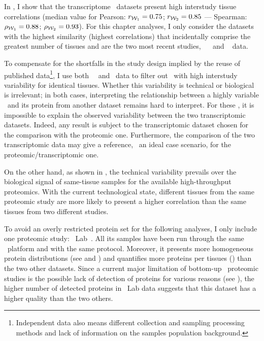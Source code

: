 In , I show that
the transcriptome \Rnaseq\ datasets present high interstudy tissue correlations
(median value for Pearson: $r_{\mathcal{W}_1}=0.75$; $r_{\mathcal{W}_2}=0.85$ ---
Spearman: $\rho_{\mathcal{W}_1}=0.88$; $\rho_{\mathcal{W}_2}=0.93$).
For this chapter analyses,
I only consider the datasets with the highest similarity
(highest correlations)
that incidentally comprise the greatest number of tissues
and are the two most recent studies,
\ie\ ~
and ~ data.\\
\vspace{-\baselineskip}

To compensate for the shortfalls in the study design implied
by the reuse of published data\footnote{%
Independent data also means
different collection and sampling processing methods and
lack of information on the samples population background.},
I use both \uhlen\ \etal\ and \gtex\ data
to filter out \mRNAs\ with high interstudy variability for identical tissues.
Whether this variability is technical or biological is irrelevant;
in both cases,
interpreting the relationship
between a highly variable \mRNAs\ and its protein from another dataset
remains hard to interpret.
For these \mRNAs,
it is impossible to explain the observed variability
between the two transcriptomic datasets.
Indeed, any result is subject to the transcriptomic dataset chosen
for the comparison with the proteomic one.
Furthermore, the comparison of the two transcriptomic data may give a reference,
\ie\ an ideal case scenario, for the proteomic/transcriptomic one.

On the other hand,
as shown in ,
the technical variability prevails over
the biological signal of same-tissue samples
for the available high-throughput proteomics.
With the current technological state,
different tissues from the same proteomic study are more likely
to present a higher correlation
than the same tissues from two different studies.

To avoid an overly restricted protein set for the following analyses,
I only include one proteomic study: \pandey\ Lab~.
All its samples have been run through the same \ms\ platform and
with the same protocol.
Moreover, it presents more homogeneous protein distributions
(see  and ) and
quantifies more proteins per tissues ()
than the two other datasets.
Since a current major limitation of bottom-up \ms\ proteomic studies
is the possible lack of detection of proteins for various reasons
(see ),
the higher number of detected proteins in \pandey\ Lab data suggests that
this dataset has a higher quality than the two others.

